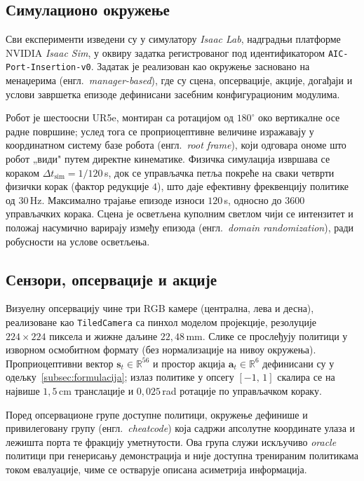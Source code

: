 \documentclass[12pt, a4paper]{article}
\begin{document}
\subsection{Симулационо окружење}
\label{subsec:sim_okruzenje}

Сви експерименти изведени су у симулатору \textit{Isaac Lab}, надградњи платформе NVIDIA \textit{Isaac Sim}, у оквиру задатка регистрованог под идентификатором \texttt{AIC-Port-Insertion-v0}.
Задатак је реализован као окружење засновано на менаџерима (енгл.\ \textit{manager-based}), где су сцена, опсервације, акције, догађаји и услови завршетка епизоде дефинисани засебним конфигурационим модулима.

Робот је шестоосни UR5e, монтиран са ротацијом од $180^\circ$ око вертикалне осе радне површине; услед тога се проприоцептивне величине изражавају у координатном систему базе робота (енгл.\ \textit{root frame}), који одговара ономе што робот „види" путем директне кинематике.
Физичка симулација извршава се кораком $\Delta t_{\mathrm{sim}} = 1/120$\,s, док се управљачка петља покреће на сваки четврти физички корак (фактор редукције $4$), што даје ефективну фреквенцију политике од $30$\,Hz.
Максимално трајање епизоде износи $120$\,s, односно до $3600$ управљачких корака.
Сцена је осветљена куполним светлом чији се интензитет и положај насумично варирају између епизода (енгл.\ \textit{domain randomization}), ради робусности на услове осветљења.

\subsection{Сензори, опсервације и акције}
\label{subsec:senzori}

Визуелну опсервацију чине три RGB камере (централна, лева и десна), реализоване као \texttt{TiledCamera} са пинхол моделом пројекције, резолуције $224 \times 224$ пиксела и жижне даљине $22{,}48$\,mm.
Слике се прослеђују политици у изворном осмобитном формату (без нормализације на нивоу окружења).
Проприоцептивни вектор $\mathbf{s}_t \in \mathbb{R}^{56}$ и простор акција $\mathbf{a}_t \in \mathbb{R}^{6}$ дефинисани су у одељку~\ref{subsec:formulacija}; излаз политике у опсегу $[-1,\,1]$ скалира се на највише $1{,}5$\,cm транслације и $0{,}025$\,rad ротације по управљачком кораку.

Поред опсервационе групе доступне политици, окружење дефинише и привилеговану групу (енгл.\ \textit{cheatcode}) која садржи апсолутне координате улаза и лежишта порта те фракцију уметнутости.
Ова група служи искључиво \textit{oracle} политици при генерисању демонстрација и није доступна тренираним политикама током евалуације, чиме се остварује описана асиметрија информација.
\end{document}
